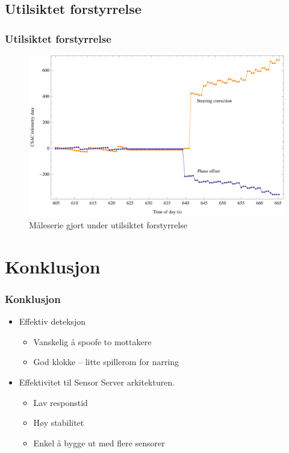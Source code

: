 \documentclass[xcolor=table]{beamer}
\begin{document}
\begin{frame}
\section{Utilsiktet forstyrrelse}
\frametitle{Utilsiktet forstyrrelse}
      \begin{figure}
        \includegraphics[scale=0.70]{thesis/graphics/disturbance57667-csac-telemetry-phase-steer-combined-zoom-in-2-1.png}
        \caption{Måleserie gjort under utilsiktet forstyrrelse}
      \end{figure}
\end{frame}

\section{Konklusjon}
\begin{frame}
  \frametitle{Konklusjon}
  \begin{itemize}
    \setlength\itemsep{2em}
    \item Effektiv deteksjon 
    \begin{itemize}
      \item Vanskelig å spoofe to mottakere
      \item God klokke -- litte spillerom for narring
    \end{itemize}
    \item Effektivitet til Sensor Server arkitekturen. 
    \begin{itemize}
      \item Lav responstid
      \item Høy stabilitet 
      \item Enkel å bygge ut med flere sensorer
    \end{itemize}
  \end{itemize}
\end{frame}
\end{document}
